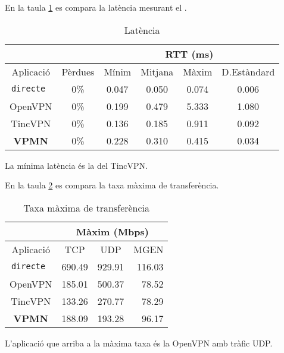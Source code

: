 En la taula \ref{T:lat} es compara la latència mesurant el .
\begin{table}[htb]
\begin{center}
\begin{tabular}{|c|c|c|c|c|c|}
\multicolumn{2}{c}{} & \multicolumn{4}{|c|}{RTT (ms)} \\ \hline
Aplicació & Pèrdues & Mínim & Mitjana & Màxim & D.Estàndard \\ \hline \hline
\tt directe & 0\% & 0.047 & 0.050 & 0.074 & 0.006 \\ \hline
OpenVPN & 0\% & 0.199 & 0.479 & 5.333 & 1.080 \\ \hline
TincVPN & 0\% & 0.136 & 0.185 & 0.911 & 0.092 \\ \hline
\bf VPMN & 0\% & 0.228 & 0.310 & 0.415 & 0.034 \\ \hline
\end{tabular}
\end{center}
\begin{center}
\caption{Latència}
\label{T:lat}
\end{center}
\end{table}
La mínima latència és la del TincVPN.

En la taula \ref{T:tax} es compara la taxa màxima de transferència.
\begin{table}[htb]
\begin{center}
\begin{tabular}{|c|c|c|r|}
\multicolumn{1}{c}{} & \multicolumn{3}{|c|}{Màxim (Mbps)} \\ \hline
Aplicació & TCP & UDP & MGEN \\ \hline \hline
\tt directe & 690.49 & 929.91 & 116.03 \\ \hline
OpenVPN & 185.01 & 500.37 & 78.52 \\ \hline
TincVPN & 133.26 & 270.77 & 78.29 \\ \hline
\bf VPMN & 188.09 & 193.28 & 96.17 \\ \hline
\end{tabular}
\end{center}
\begin{center}
\caption{Taxa màxima de transferència}
\label{T:tax}
\end{center}
\end{table}
L'aplicació que arriba a la màxima taxa és la OpenVPN amb tràfic UDP.
